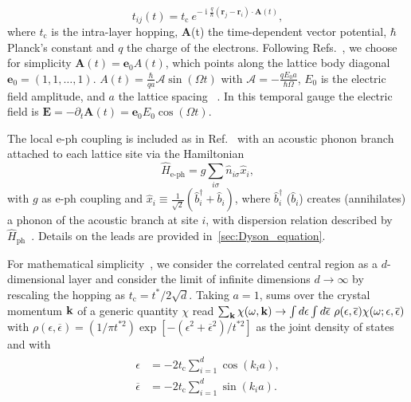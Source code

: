 \documentclass[aps,prb,groupedaddress,showpacs,twocolumn,superscriptaddress,10pt]{revtex4-2}
\DeclareMathOperator*{\ii}{i} %
\renewcommand{\vec}[1]{\bm{#1}} %
\newcommand{\aamp}{\mathcal{A}}
\begin{document}
\begin{equation}\label{eq:peierls} 
t_{ij}(t) = t_{\text{c}} \ e^{-\ii \frac{q}{\hbar} \left( \vec{r}_j - \vec{r}_i \right) \cdot \vec{A}(t)}, 
\end{equation}
% 
where $t_{\text{c}}$ is the intra-layer hopping, $\vec{A}$(t) the time-dependent vector potential, $\hbar$ Planck's constant and $q$ the charge of the electrons. Following Refs.~\cite{ts.ok.08,mu.we.18}, we choose for simplicity
 $\vec{A}(t)=\vec{e}_{0} A(t)$, which points along the 
lattice body diagonal $\vec{e}_{0}=(1,1,\dots,1)$.  $A(t)=\frac{\hbar}{qa}\aamp\sin(\Omega t)$ with $\aamp=-\frac{qE_0a}{\hbar\Omega}$,  $E_0$ is the  electric field amplitude, and $a$ the lattice spacing ~\cite{ts.ok.08}. 
In this temporal gauge the electric field is $\vec{E}= -\partial_{t}\vec{A}(t) = \vec{e}_{0}E_0 \cos(\Omega t)$.
   
The local e-ph coupling is included as in Ref.~\cite{ma.ga.22u} with an acoustic phonon branch attached to each lattice site via the Hamiltonian 
\begin{equation}\label{eq:e-ph_ham} 
\hat{H}_{\text{e-ph}} = g \sum_{i\sigma} \hat{n}_{i\sigma} \hat{x}_{i},  
\end{equation}
with $g$ as e-ph coupling and $\hat{x}_{i} \equiv \frac{1}{\sqrt{2}} \left( \hat{b}^{\dagger}_{i} + \hat{b}_i \right)$, where $\hat{b}^{\dagger}_{i}$ ($\hat{b}_{i}$) creates (annihilates) a phonon of the acoustic branch at site $i$, with dispersion relation described by $\hat{H}_{\text{ph}}$~\cite{ma.ga.22u}.  Details on the leads are provided in~\ref{sec:Dyson_equation}.  
 
For mathematical simplicity~\cite{ge.ko.92,ao.ts.14}, 
 we consider the correlated central region as a $d$-dimensional layer and consider the limit of infinite dimensions $d \rightarrow \infty$ by rescaling the hopping as $t_{\text{c}}=t^{\ast}/2\sqrt{d}$. Taking $a=1$, sums over the crystal momentum ${\bf k}$ of a generic quantity $\chi$ read $\sum_{{\bf k}} \chi(\omega,{\bf k}) \rightarrow \int d\epsilon \int   d\overline{\epsilon} \ \rho(\epsilon,\overline{\epsilon}) \chi(\omega;\epsilon,\overline{\epsilon})$ with $\rho(\epsilon,\overline{\epsilon}) = (1/\pi t^{\ast 2}) \exp[-( \epsilon^{2} + \overline{\epsilon}^{2})/t^{\ast 2}]$ as the joint density of states~\cite{ts.ok.08} and with
% 
\begin{align}\label{eq:d-dim_crystal_dep}
\begin{split}  
\epsilon & = -2t_{\text{c}} \sum_{i=1}^{d} \cos(k_i a), \\  
\overline{\epsilon}& = -2t_{\text{c}}\sum_{i=1}^{d} \sin(k_i a). \\
\end{split}  
\end{align}
%  
  
\end{document}

